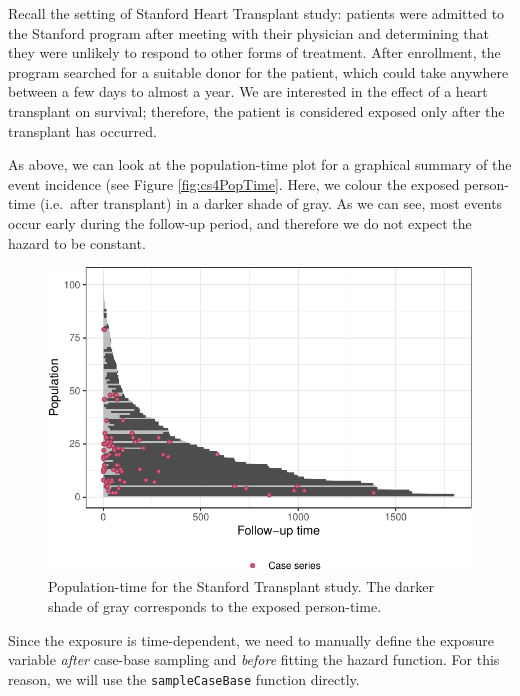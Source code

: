 \documentclass[
]{jss}
\begin{document}
Recall the setting of Stanford Heart Transplant study: patients were
admitted to the Stanford program after meeting with their physician and
determining that they were unlikely to respond to other forms of
treatment. After enrollment, the program searched for a suitable donor
for the patient, which could take anywhere between a few days to almost
a year. We are interested in the effect of a heart transplant on
survival; therefore, the patient is considered exposed only after the
transplant has occurred.

As above, we can look at the population-time plot for a graphical
summary of the event incidence (see Figure \ref{fig:cs4PopTime}. Here,
we colour the exposed person-time (i.e.~after transplant) in a darker
shade of gray. As we can see, most events occur early during the
follow-up period, and therefore we do not expect the hazard to be
constant.

\begin{CodeChunk}
\begin{figure}[ht]

{\centering \includegraphics[width=\textwidth,keepaspectratio=true]{../figures/stanford-poptime-1} 

}

\caption{\label{fig:cs4PopTime} Population-time for the Stanford Transplant study. The darker shade of gray corresponds to the exposed person-time.}\label{fig:stanford-poptime}
\end{figure}
\end{CodeChunk}

Since the exposure is time-dependent, we need to manually define the
exposure variable \emph{after} case-base sampling and \emph{before}
fitting the hazard function. For this reason, we will use the
\texttt{sampleCaseBase} function directly.
\end{document}
